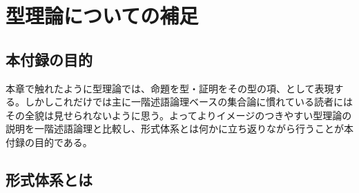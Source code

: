 \documentclass[a4paper,12pt]{bxjsbook}
\newlength{\customindent}
\newenvironment{body}{
  \par
  \begingroup
  \setlength{\leftskip}{\customindent}
  \setlength{\rightskip}{0pt}
  \setlength{\parindent}{1em}
  \setlength{\displayindent}{\customindent}
  \setlength{\displaywidth}{\dimexpr\linewidth-\customindent\relax}
}{
  \par
  \endgroup
}
\theoremstyle{theorem}
\begin{document}
    \appendix

    \chapter{型理論についての補足}\label{appendix:type-theory}

    \section{本付録の目的}
    \begin{body}
        \indent 本章で触れたように型理論では、命題を型・証明をその型の項、として表現する。しかしこれだけでは主に一階述語論理ベースの集合論に慣れている読者にはその全貌は見せられないように思う。よってよりイメージのつきやすい型理論の説明を一階述語論理と比較し、形式体系とは何かに立ち返りながら行うことが本付録の目的である。
    \end{body}

    \section{形式体系とは}
\end{document}
